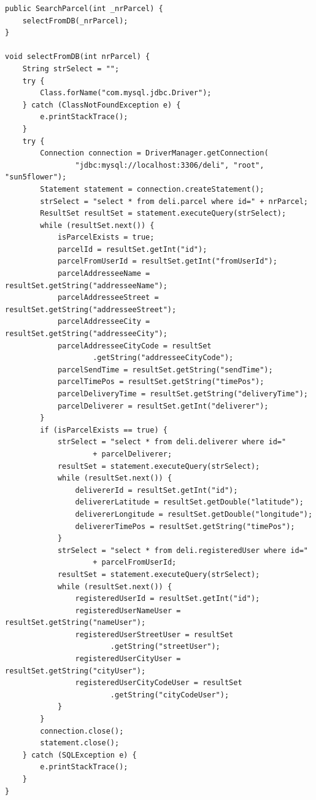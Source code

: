\documentclass[eng,printmode,oneside]{mgr}
\begin{document}
\begin{lstlisting}[caption=Klasa reprezentująca
połączenie z bazą danych i pobierająca wszystkie dane o
przesyłce,label=searchparcel.java]
public SearchParcel(int _nrParcel) {
	selectFromDB(_nrParcel); 
}

void selectFromDB(int nrParcel) {
	String strSelect = "";
	try {
		Class.forName("com.mysql.jdbc.Driver");
	} catch (ClassNotFoundException e) {
		e.printStackTrace();
	}
	try {
		Connection connection = DriverManager.getConnection(
				"jdbc:mysql://localhost:3306/deli", "root", "sun5flower");
		Statement statement = connection.createStatement();
		strSelect = "select * from deli.parcel where id=" + nrParcel;
		ResultSet resultSet = statement.executeQuery(strSelect);
		while (resultSet.next()) {
			isParcelExists = true;
			parcelId = resultSet.getInt("id");
			parcelFromUserId = resultSet.getInt("fromUserId");
			parcelAddresseeName = resultSet.getString("addresseeName");
			parcelAddresseeStreet = resultSet.getString("addresseeStreet");
			parcelAddresseeCity = resultSet.getString("addresseeCity");
			parcelAddresseeCityCode = resultSet
					.getString("addresseeCityCode");
			parcelSendTime = resultSet.getString("sendTime");
			parcelTimePos = resultSet.getString("timePos");
			parcelDeliveryTime = resultSet.getString("deliveryTime");
			parcelDeliverer = resultSet.getInt("deliverer");
		}
		if (isParcelExists == true) {
			strSelect = "select * from deli.deliverer where id="
					+ parcelDeliverer;
			resultSet = statement.executeQuery(strSelect);
			while (resultSet.next()) {
				delivererId = resultSet.getInt("id");
				delivererLatitude = resultSet.getDouble("latitude");
				delivererLongitude = resultSet.getDouble("longitude");
				delivererTimePos = resultSet.getString("timePos");
			}
			strSelect = "select * from deli.registeredUser where id="
					+ parcelFromUserId;
			resultSet = statement.executeQuery(strSelect);
			while (resultSet.next()) {
				registeredUserId = resultSet.getInt("id");
				registeredUserNameUser = resultSet.getString("nameUser");
				registeredUserStreetUser = resultSet
						.getString("streetUser");
				registeredUserCityUser = resultSet.getString("cityUser");
				registeredUserCityCodeUser = resultSet
						.getString("cityCodeUser");
			}
		}
		connection.close();
		statement.close();
	} catch (SQLException e) {
		e.printStackTrace();
	}
}
\end{lstlisting}
\end{document}
